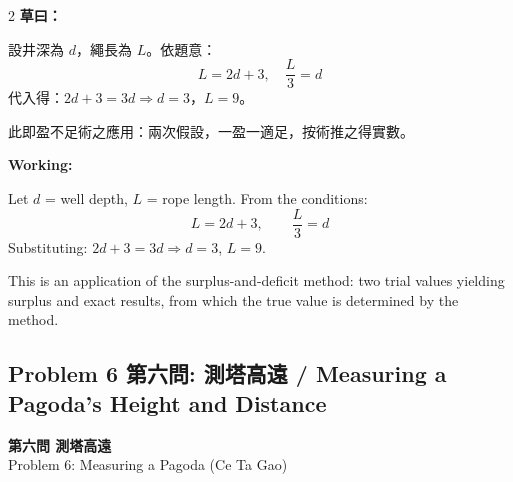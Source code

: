 \documentclass[11pt,a4paper]{article}
\newcommand{\probheader}[2]{%
  \begin{center}
  \colorbox{problembg}{\parbox{\dimexpr\linewidth-4pt}{%
    \centering\smallskip
    {\large\bfseries\color{sectioncolor}#1}\\[0.3em]
    {\normalsize\color{subsectioncolor}#2}%
    \smallskip
  }}
  \end{center}
  \vspace{0.5em}
}
\begin{document}
\vspace{0.5em}

\begin{paracol}{2}
\switchcolumn[0]
\noindent\textbf{草曰：}

設井深為 $d$，繩長為 $L$。依題意：
\[
L = 2d + 3, \quad \frac{L}{3} = d
\]
代入得：$2d + 3 = 3d \Rightarrow d = 3$，$L = 9$。

此即盈不足術之應用：兩次假設，一盈一適足，按術推之得實數。

\switchcolumn[1]
\noindent\textbf{Working:}

Let $d$ = well depth, $L$ = rope length. From the conditions:
\[
L = 2d + 3, \qquad \frac{L}{3} = d
\]
Substituting: $2d + 3 = 3d \Rightarrow d = 3$, $L = 9$.

This is an application of the surplus-and-deficit method: two trial values yielding surplus and exact results, from which the true value is determined by the method.
\end{paracol}

\newpage

\subsection*{Problem 6 第六問: 測塔高遠 / Measuring a Pagoda's Height and Distance}

\probheader{第六問 測塔高遠}{Problem 6: Measuring a Pagoda (Ce Ta Gao)}
\end{document}
